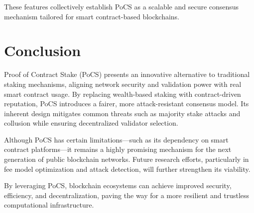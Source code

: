 \documentclass{article}
\begin{document}
These features collectively establish PoCS as a scalable and secure consensus mechanism tailored for smart contract-based blockchains.

\section{Conclusion}

Proof of Contract Stake (PoCS) presents an innovative alternative to traditional staking mechanisms, aligning network security and validation power with real smart contract usage. By replacing wealth-based staking with contract-driven reputation, PoCS introduces a fairer, more attack-resistant consensus model. Its inherent design mitigates common threats such as majority stake attacks and collusion while ensuring decentralized validator selection.

Although PoCS has certain limitations—such as its dependency on smart contract platforms—it remains a highly promising mechanism for the next generation of public blockchain networks. Future research efforts, particularly in fee model optimization and attack detection, will further strengthen its viability.

By leveraging PoCS, blockchain ecosystems can achieve improved security, efficiency, and decentralization, paving the way for a more resilient and trustless computational infrastructure.
\end{document}
